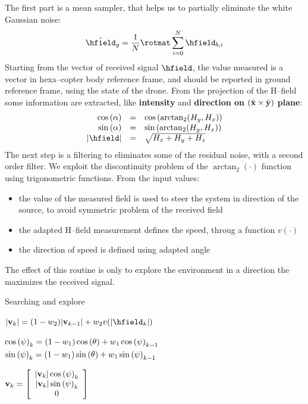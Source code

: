 The first part is a mean sampler, that helps us to partially eliminate the white Gaussian noise:
\begin{equation}
	\hat{\hfield}_g = \dfrac{1}{N} \rotmat \sum\limits_{i=0}^{N} \hfield_{b,i}
\end{equation}
Starting from the vector of received signal $\hfield$, the value measured is a vector in hexa--copter body reference frame, and should be reported in ground reference frame, using the state of the drone. From the projection of the H--field some information are extracted, like \textbf{intensity} and \textbf{direction on} $(\hat{\mathbf{x}}\times\hat{\mathbf{y}})$ \textbf{plane}:
\begin{equation}
\begin{array}{rcl}
	\ccos{\alpha} & = & \ccos{\arctan_2(H_y,H_x)} \\
	\ssin{\alpha} & = & \ssin{\arctan_2(H_y,H_x)} \\
	\abs{\hfield} & = & \sqrt{H_x+H_y+H_z}
\end{array}
\end{equation}
The next step is a filtering to eliminates some of the residual noise, with a second order filter. We exploit the discontinuity problem of the ${\arctan_2(\cdot)}$ function using trigonometric functions. From the input values:
\begin{itemize}
\item the value of the measured field is used to steer the system in direction of the source, to avoid symmetric problem of the received field
\item the adapted H--field measurement defines the speed, throug a function ${v(\cdot)}$
\item the direction of speed is defined using adapted angle
\end{itemize}
The effect of this routine is only to explore the environment in a direction the maximizes the received signal.

\begin{algorithm}
\caption{Searching and explore}

$|\mathbf{v}_{k}| = (1-w_2) |\mathbf{v}_{k-1}| + w_2 v(|\hfield_k|)$\;

$\cos\left( \psi \right)_k = (1-w_1) \cos\left( \theta \right) + w_1 \cos\left( \psi \right)_{k-1} $\;
$\sin\left( \psi \right)_k = (1-w_1) \sin\left( \theta \right) + w_1 \sin\left( \psi \right)_{k-1} $\;

\renewcommand{\arraystretch}{1}
$\mathbf{v}_k = \left[\begin{array}{c}
	|\mathbf{v}_k| \cos\left( \psi \right)_k \\
	|\mathbf{v}_k| \sin\left( \psi \right)_k \\
	0
\end{array}\right]$\;
\renewcommand{\arraystretch}{1.75}
\end{algorithm}

